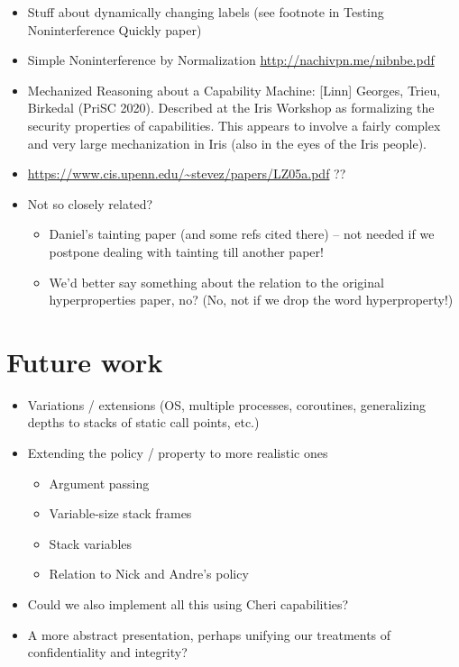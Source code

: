 \documentclass[conference]{IEEEtran}
\begin{document}
\begin{itemize}
\begin{itemize}
\end{itemize}

\item Stuff about dynamically changing labels (see footnote in Testing
Noninterference Quickly paper)

\item Simple Noninterference by Normalization \url{http://nachivpn.me/nibnbe.pdf}

\item Mechanized Reasoning about a Capability Machine: [Linn] Georges,
Trieu, Birkedal (PriSC 2020).
%
Described at the Iris Workshop as formalizing the security properties of
capabilities. This appears to involve a fairly complex and very large
mechanization in Iris (also in the eyes of the Iris people).



\item \url{https://www.cis.upenn.edu/~stevez/papers/LZ05a.pdf} ??

\item Not so closely related?
\begin{itemize}
\item Daniel's tainting paper (and some refs cited there)
      \cite{DBLP:conf/eurosp/SchoepeBPS16} -- not needed if we postpone
      dealing with tainting till another paper!
\item We'd better say something about the relation to the original
hyperproperties paper, no?  (No, not if we drop the word hyperproperty!) 
\end{itemize}
\end{itemize}

\iftext
\section{Future work}

\begin{itemize}
\item Variations / extensions (OS, multiple processes, coroutines, generalizing depths to stacks of static call points, etc.)
\item Extending the policy / property to more realistic ones
\begin{itemize}
\item Argument passing
\item Variable-size stack frames
\item Stack variables
\item Relation to Nick and Andre’s policy
\end{itemize}
\item Could we also implement all this using Cheri capabilities?
\item A more abstract presentation, perhaps unifying our treatments of
confidentiality and integrity?
\end{itemize}
\end{document}
